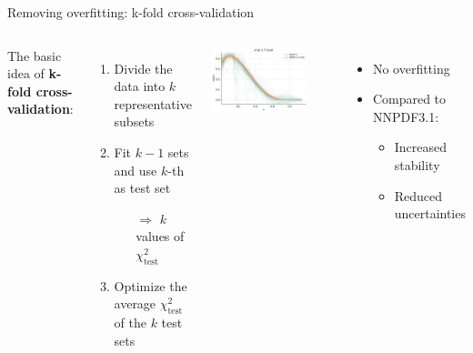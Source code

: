 \documentclass[aspectratio=169,10pt]{beamer}
\begin{document}
\begin{frame}{Removing overfitting: k-fold cross-validation}
\begin{columns}
The basic idea of \textbf{k-fold cross-validation}:
\begin{enumerate}
    \item Divide the data into $k$ {representative subsets}
    \item Fit $k-1$ sets and use $k$-th as test set
    \begin{itemize}
        \item[$\Rightarrow$] $k$ values of $\chi^2_\mathrm{test}$
    \end{itemize}
    \item Optimize the average $\chi^2_\mathrm{test}$ of the $k$ test sets
\end{enumerate}



\includegraphics[width=0.8\textwidth]{methodology/best_model_vs_nnpdf31}

\begin{itemize}
     \item No overfitting\\
     \vspace*{0.2em}
     \item Compared to NNPDF3.1:
    \begin{itemize}
        \item Increased stability
        \item Reduced uncertainties 
    \end{itemize}
\end{itemize}


\end{columns}
\end{frame}
\end{document}

